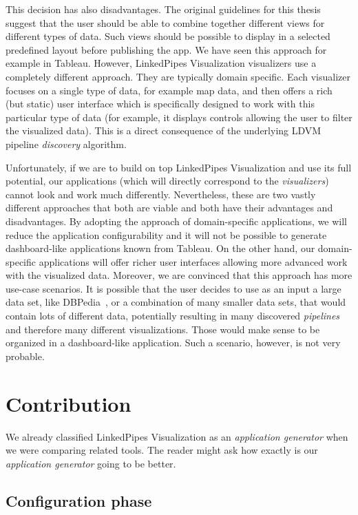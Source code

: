 This decision has also disadvantages. The original guidelines for this thesis suggest that the user should be able to combine together different views for different types of data. Such views should be possible to display in a selected predefined layout before publishing the app. We have seen this approach for example in Tableau. However, LinkedPipes Visualization visualizers use a completely different approach. They are typically domain specific. Each visualizer focuses on a single type of data, for example map data, and then offers a rich (but static) user interface which is specifically designed to work with this particular type of data (for example, it displays controls allowing the user to filter the visualized data). This is a direct consequence of the underlying LDVM pipeline \emph{discovery} algorithm.

Unfortunately, if we are to build on top LinkedPipes Visualization and use its full potential, our applications (which will directly correspond to the \emph{visualizers}) cannot look and work much differently. Nevertheless, these are two vastly different approaches that both are viable and both have their advantages and disadvantages. By adopting the approach of domain-specific applications, we will reduce the application configurability and it will not be possible to generate dashboard-like applications known from Tableau. On the other hand, our domain-specific applications will offer richer user interfaces allowing more advanced work with the visualized data. Moreover, we are convinced that this approach has more use-case scenarios. It is possible that the user decides to use as an input a large data set, like DBPedia~\cite{dbpedia}, or a combination of many smaller data sets, that would contain lots of different data, potentially resulting in many discovered \emph{pipelines} and therefore many different visualizations. Those would make sense to be organized in a dashboard-like application. Such a scenario, however, is not very probable.

\section{Contribution}

We already classified LinkedPipes Visualization as an \emph{application generator} when we were comparing related tools. The reader might ask how exactly is our \emph{application generator} going to be better. 

\subsection{Configuration phase}

